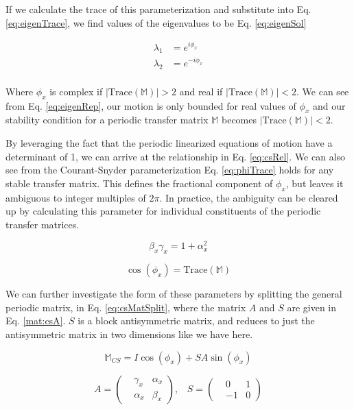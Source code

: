 If we calculate the trace of this parameterization and substitute into Eq. \ref{eq:eigenTrace}, we find values of the eigenvalues to be Eq. \ref{eq:eigenSol}

\begin{equation} \label{eq:eigenSol}
\begin{split}
	\lambda_1 &= e^{i\phi_x}\\
	\lambda_2 &= e^{-i\phi_x}\\
\end{split}
\end{equation}

Where $\phi_x$ is complex if $|\mathrm{Trace}(\mathbb{M})| > 2$ and real if $|\mathrm{Trace}(\mathbb{M})| < 2$. We can see from Eq. \ref{eq:eigenRep}, our motion is only bounded for real values of $\phi_x$ and our stability condition for a periodic transfer matrix $\mathbb{M}$ becomes $|\mathrm{Trace}(\mathbb{M})| < 2$.

By leveraging the fact that the periodic linearized equations of motion have a determinant of 1, we can arrive at the relationship in Eq. \ref{eq:csRel}. We can also see from the Courant-Snyder parameterization Eq. \ref{eq:phiTrace} holds for any stable transfer matrix. This defines the fractional component of $\phi_x$, but leaves it ambiguous to integer multiples of $2\pi$. In practice, the ambiguity can be cleared up by calculating this parameter for individual constituents of the periodic transfer matrices.

\begin{equation} \label{eq:csRel}
	\beta_x \gamma_x  = 1 + \alpha_x^2
\end{equation}

\begin{equation} \label{eq:phiTrace}
	\cos{\left(\phi_x\right)} = \mathrm{Trace}(\mathbb{M})
\end{equation}

We can further investigate the form of these parameters by splitting the general periodic matrix, in Eq. \ref{eq:csMatSplit}, where the matrix $A$ and $S$ are given in Eq. \ref{mat:csA}. $S$ is a block antisymmetric matrix, and reduces to just the antisymmetric matrix in two dimensions like we have here.

\begin{equation} \label{eq:csMatSplit}
	\mathbb{M}_{CS} = I \cos{\left(\phi_x\right)} + S A \sin{\left(\phi_x\right)}
\end{equation}

\begin{equation} \label{mat:csA}
	A = 
\begin{pmatrix}
	&\gamma_x &\alpha_x\\
	&\alpha_x &\beta_x
\end{pmatrix},
\hspace{10pt} S =
\begin{pmatrix}
	&0 &1\\
	&-1 &0
\end{pmatrix}
\end{equation}


